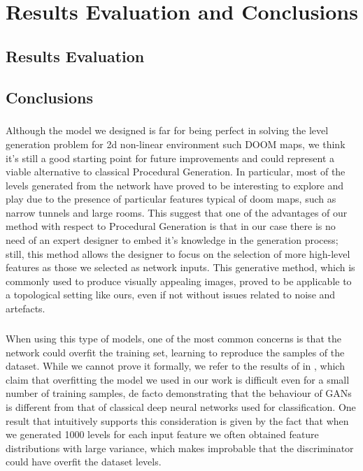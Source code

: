 \chapter{Results Evaluation and Conclusions}
\section{Results Evaluation}


\section{Conclusions}
\paragraph{} Although the model we designed is far for being perfect in solving the level generation problem for 2d non-linear environment such DOOM maps, we think it's still a good starting point for future improvements and could represent a viable alternative to classical Procedural Generation. In particular, most of the levels generated from the network have proved to be interesting to explore and play due to the presence of particular features typical of doom maps, such as narrow tunnels and large rooms. This suggest that one of the advantages of our method with respect to Procedural Generation is that in our case there is no need of an expert designer to embed it's knowledge in the generation process; still, this method allows the designer to focus on the selection of more high-level features as those we selected as network inputs. This generative method, which is commonly used to produce visually appealing images, proved to be applicable to a topological setting like ours, even if not without issues related to noise and artefacts.

\paragraph{} When using this type of models, one of the most common concerns is that the network could overfit the training set, learning to reproduce the samples of the dataset. While we cannot prove it formally, we refer to the results of \citeauthor{empiricalevaluation} in \cite[Appendix~C]{empiricalevaluation}, which claim that overfitting the model we used in our work is difficult even for a small number of training samples, de facto demonstrating that the behaviour of GANs is different from that of classical deep neural networks used for classification. One result that intuitively supports this consideration is given by the fact that when we generated 1000 levels for each input feature we often obtained feature distributions with large variance, which makes improbable that the discriminator could have overfit the dataset levels.



